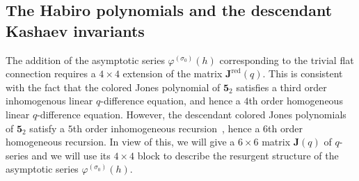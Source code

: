 \documentclass[12pt,reqno]{amsart}
\theoremstyle{definition}
\def\s{\sigma}
\def\bJ{\mathbf J}
\def\RED{\mathrm{red}}
\def\md{\mathbf}
\newcommand{\knot}[1]{\md{#1}}
\begin{document}
\subsection{The Habiro polynomials and the descendant Kashaev invariants}
\label{sub.52hab}

The addition of the asymptotic series $\varphi^{(\s_0)}(h)$ corresponding to the
trivial flat connection
requires a $4 \times 4$ extension of the matrix $\bJ^\RED(q)$. This is consistent
with the fact that the colored Jones polynomial of $\knot{5}_2$ satisfies a third order
inhomogenous linear $q$-difference equation, and hence a $4$th order homogeneous
linear $q$-difference equation. However, the descendant colored Jones polynomials
of $\knot{5}_2$ satisfy a $5$th order inhomogeneous recursion~\cite[Eqn.(14)]{GK:desc},
hence a $6$th order homogeneous recursion. In view of this, we will give a
$6 \times 6$ matrix $\bJ(q)$ of $q$-series and we will use its $4 \times 4$ block
to describe the resurgent structure of the asymptotic series $\varphi^{(\s_0)}(h)$.
\end{document}
